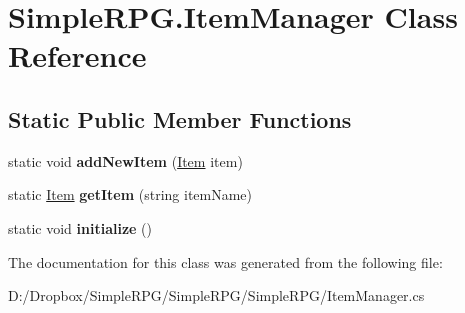 \hypertarget{class_simple_r_p_g_1_1_item_manager}{\section{Simple\+R\+P\+G.\+Item\+Manager Class Reference}
\label{class_simple_r_p_g_1_1_item_manager}
}
\subsection*{Static Public Member Functions}
\begin{DoxyCompactItemize}
\item 
\hypertarget{class_simple_r_p_g_1_1_item_manager_a50b3096096d3181934d872b5b96a0477}{static void {\bfseries add\+New\+Item} (\hyperlink{class_simple_r_p_g_1_1_item}{Item} item)}\label{class_simple_r_p_g_1_1_item_manager_a50b3096096d3181934d872b5b96a0477}

\item 
\hypertarget{class_simple_r_p_g_1_1_item_manager_a1bed1b8f2d71a468934d1b652f14e711}{static \hyperlink{class_simple_r_p_g_1_1_item}{Item} {\bfseries get\+Item} (string item\+Name)}\label{class_simple_r_p_g_1_1_item_manager_a1bed1b8f2d71a468934d1b652f14e711}

\item 
\hypertarget{class_simple_r_p_g_1_1_item_manager_a2a9850af52bb4675e337d344e570a5e1}{static void {\bfseries initialize} ()}\label{class_simple_r_p_g_1_1_item_manager_a2a9850af52bb4675e337d344e570a5e1}

\end{DoxyCompactItemize}


The documentation for this class was generated from the following file\+:\begin{DoxyCompactItemize}
\item 
D\+:/\+Dropbox/\+Simple\+R\+P\+G/\+Simple\+R\+P\+G/\+Simple\+R\+P\+G/Item\+Manager.\+cs\end{DoxyCompactItemize}
